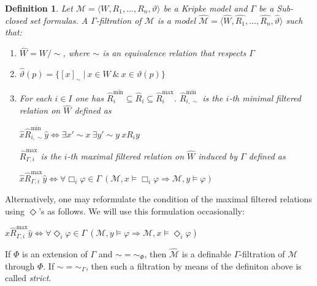 \documentclass[a4paper]{article}
\theoremstyle{defin}
\newtheorem{defin}{Definition}
\theoremstyle{theorem}
\theoremstyle{prop}
\theoremstyle{lemma}
\theoremstyle{fact}
\theoremstyle{ex}
\theoremstyle{col}
\theoremstyle{claim}
\begin{document}
\begin{defin}
  Let $\mathcal{M} = \langle W, R_1, \dots, R_n, \vartheta \rangle$ be a Kripke model and $\Gamma$ be a Sub-closed set formulas. A $\Gamma$-filtration of $\mathcal{M}$ is a model
  $\widehat{\mathcal{M}} = \langle \widehat{W}, \widehat{R_1}, \dots, \widehat{R_n}, \widehat{\vartheta} \rangle$ such that:
  \begin{enumerate}
    \item $\widehat{W} = W / \sim$, where $\sim$ is an equivalence relation that respects $\Gamma$
    \item $\widehat{\vartheta}(p) = \{ [x]_{\sim} \: | \: x \in W \: \& \: x \in \vartheta(p)\}$
    \item For each $i \in I$ one has $\widehat{R}_i^{\text{min}} \subseteq \widehat{R}_i \subseteq \widehat{R}_i^{\text{max}}$. $\widehat{R}_{i, \sim}^{\text{min}}$ is the $i$-th minimal filtered relation on $\widehat{W}$ defined as
    \begin{center}
      $\hat{x} \widehat{R}_{i, \sim}^{\text{min}} \hat{y} \Leftrightarrow \exists x' \sim x \: \exists y' \sim y \: x R_i y$
    \end{center}
    $\widehat{R}_{\Gamma,i}^{\text{max}}$ is the $i$-th maximal filtered relation on $\widehat{W}$ induced by $\Gamma$ defined as
    \begin{center}
      $\hat{x} \widehat{R}_{\Gamma,i}^{\text{max}} \hat{y} \Leftrightarrow \forall \Box_i \varphi \in \Gamma \: (\mathcal{M}, x \models \Box_i \varphi \Rightarrow \mathcal{M}, y \models \varphi)$
    \end{center}
  \end{enumerate}
\end{defin}

Alternatively, one may reformulate the condition of the maximal filtered relations using $\Diamond$'s as follows. We will use this formulation occasionally:

\begin{center}
  $\hat{x} \widehat{R}_{\Gamma,i}^{\text{max}} \hat{y} \Leftrightarrow \forall \Diamond_i \varphi \in \Gamma \: (\mathcal{M}, y \models \varphi \Rightarrow \mathcal{M}, x \models \Diamond_i \varphi)$
\end{center}

If $\Phi$ is an extension of $\Gamma$ and $\sim = \sim_{\Phi}$, then $\widehat{\mathcal{M}}$ is a definable $\Gamma$-filtration of $\mathcal{M}$ through $\Phi$. If $\sim = \sim_{\Gamma}$, then such a filtration by means of the definiton above is called \emph{strict}.
\end{document}
